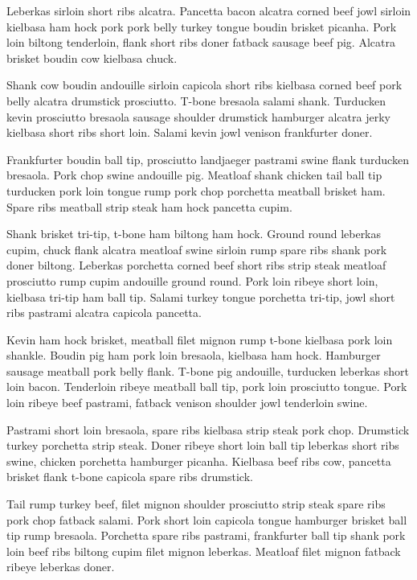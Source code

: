 \documentclass[openany,letterpaper,11pt]{report}
\begin{document}
Leberkas sirloin short ribs alcatra. Pancetta bacon alcatra corned beef jowl sirloin kielbasa ham hock pork pork belly turkey tongue boudin brisket picanha. Pork loin biltong tenderloin, flank short ribs doner fatback sausage beef pig. Alcatra brisket boudin cow kielbasa chuck.\newline

Shank cow boudin andouille sirloin capicola short ribs kielbasa corned beef pork belly alcatra drumstick prosciutto. T-bone bresaola salami shank. Turducken kevin prosciutto bresaola sausage shoulder drumstick hamburger alcatra jerky kielbasa short ribs short loin. Salami kevin jowl venison frankfurter doner.\newline

Frankfurter boudin ball tip, prosciutto landjaeger pastrami swine flank turducken bresaola. Pork chop swine andouille pig. Meatloaf shank chicken tail ball tip turducken pork loin tongue rump pork chop porchetta meatball brisket ham. Spare ribs meatball strip steak ham hock pancetta cupim.\newline

Shank brisket tri-tip, t-bone ham biltong ham hock. Ground round leberkas cupim, chuck flank alcatra meatloaf swine sirloin rump spare ribs shank pork doner biltong. Leberkas porchetta corned beef short ribs strip steak meatloaf prosciutto rump cupim andouille ground round. Pork loin ribeye short loin, kielbasa tri-tip ham ball tip. Salami turkey tongue porchetta tri-tip, jowl short ribs pastrami alcatra capicola pancetta.\newline

Kevin ham hock brisket, meatball filet mignon rump t-bone kielbasa pork loin shankle. Boudin pig ham pork loin bresaola, kielbasa ham hock. Hamburger sausage meatball pork belly flank. T-bone pig andouille, turducken leberkas short loin bacon. Tenderloin ribeye meatball ball tip, pork loin prosciutto tongue. Pork loin ribeye beef pastrami, fatback venison shoulder jowl tenderloin swine.\newline

Pastrami short loin bresaola, spare ribs kielbasa strip steak pork chop. Drumstick turkey porchetta strip steak. Doner ribeye short loin ball tip leberkas short ribs swine, chicken porchetta hamburger picanha. Kielbasa beef ribs cow, pancetta brisket flank t-bone capicola spare ribs drumstick.\newline

Tail rump turkey beef, filet mignon shoulder prosciutto strip steak spare ribs pork chop fatback salami. Pork short loin capicola tongue hamburger brisket ball tip rump bresaola. Porchetta spare ribs pastrami, frankfurter ball tip shank pork loin beef ribs biltong cupim filet mignon leberkas. Meatloaf filet mignon fatback ribeye leberkas doner.\newline
\end{document}
